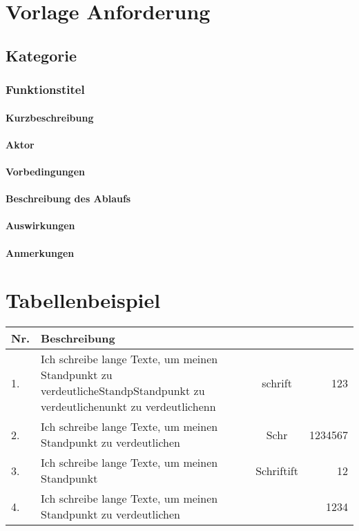 \documentclass[10pt,a4paper]{article}
\begin{document}
    \section{Vorlage Anforderung}
    \subsection{Kategorie}
    \subsubsection{\textbf{Funktionstitel}}
    \paragraph{Kurzbeschreibung}
    \paragraph{Aktor}
    \paragraph{Vorbedingungen}
    \paragraph{Beschreibung des Ablaufs}
    \paragraph{Auswirkungen}
    \paragraph{Anmerkungen}

    \section{Tabellenbeispiel}
    \begin{tabularx}{\textwidth}{l|X|c|r}
        \textbf{Nr.} & \textbf{Beschreibung} & &\\
      \hline
      1. & Ich schreibe lange Texte, um meinen Standpunkt zu verdeutlicheStandpStandpunkt zu verdeutlichenunkt zu verdeutlichenn  & schrift  &  123 \\
      \hline
      2. & Ich schreibe lange Texte, um meinen Standpunkt zu verdeutlichen  & Schr  &   1234567 \\
      3. & Ich schreibe lange Texte, um meinen Standpunkt   & Schriftift  &   12 \\
      4. & Ich schreibe lange Texte, um meinen Standpunkt zu verdeutlichen  &   &   1234 \\
      \end{tabularx}
\end{document}

